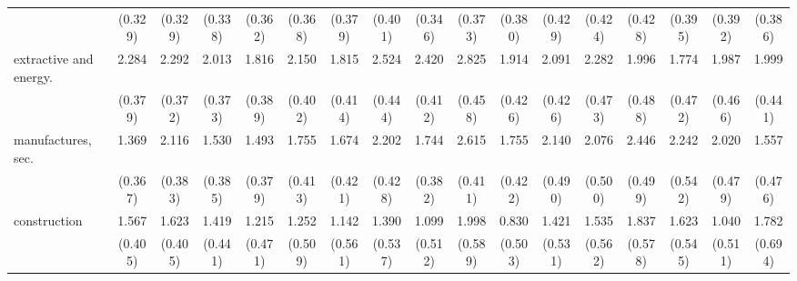 {\begin{tabular}{l*{16}{c}}
                    &     (0.329)         &     (0.329)         &     (0.338)         &     (0.362)         &     (0.368)         &     (0.379)         &     (0.401)         &     (0.346)         &     (0.373)         &     (0.380)         &     (0.429)         &     (0.424)         &     (0.428)         &     (0.395)         &     (0.392)         &     (0.386)         \\
[1em]
extractive and energy.&       2.284\sym{***}&       2.292\sym{***}&       2.013\sym{***}&       1.816\sym{***}&       2.150\sym{***}&       1.815\sym{***}&       2.524\sym{***}&       2.420\sym{***}&       2.825\sym{***}&       1.914\sym{***}&       2.091\sym{***}&       2.282\sym{***}&       1.996\sym{***}&       1.774\sym{***}&       1.987\sym{***}&       1.999\sym{***}\\
                    &     (0.379)         &     (0.372)         &     (0.373)         &     (0.389)         &     (0.402)         &     (0.414)         &     (0.444)         &     (0.412)         &     (0.458)         &     (0.426)         &     (0.426)         &     (0.473)         &     (0.488)         &     (0.472)         &     (0.466)         &     (0.441)         \\
[1em]
manufactures, sec.  &       1.369\sym{***}&       2.116\sym{***}&       1.530\sym{***}&       1.493\sym{***}&       1.755\sym{***}&       1.674\sym{***}&       2.202\sym{***}&       1.744\sym{***}&       2.615\sym{***}&       1.755\sym{***}&       2.140\sym{***}&       2.076\sym{***}&       2.446\sym{***}&       2.242\sym{***}&       2.020\sym{***}&       1.557\sym{**} \\
                    &     (0.367)         &     (0.383)         &     (0.385)         &     (0.379)         &     (0.413)         &     (0.421)         &     (0.428)         &     (0.382)         &     (0.411)         &     (0.422)         &     (0.490)         &     (0.500)         &     (0.499)         &     (0.542)         &     (0.479)         &     (0.476)         \\
[1em]
construction        &       1.567\sym{***}&       1.623\sym{***}&       1.419\sym{**} &       1.215\sym{**} &       1.252\sym{*}  &       1.142\sym{*}  &       1.390\sym{**} &       1.099\sym{*}  &       1.998\sym{***}&       0.830         &       1.421\sym{**} &       1.535\sym{**} &       1.837\sym{**} &       1.623\sym{**} &       1.040\sym{*}  &       1.782\sym{*}  \\
                    &     (0.405)         &     (0.405)         &     (0.441)         &     (0.471)         &     (0.509)         &     (0.561)         &     (0.537)         &     (0.512)         &     (0.589)         &     (0.503)         &     (0.531)         &     (0.562)         &     (0.578)         &     (0.545)         &     (0.511)         &     (0.694)         \\

\end{tabular}}
